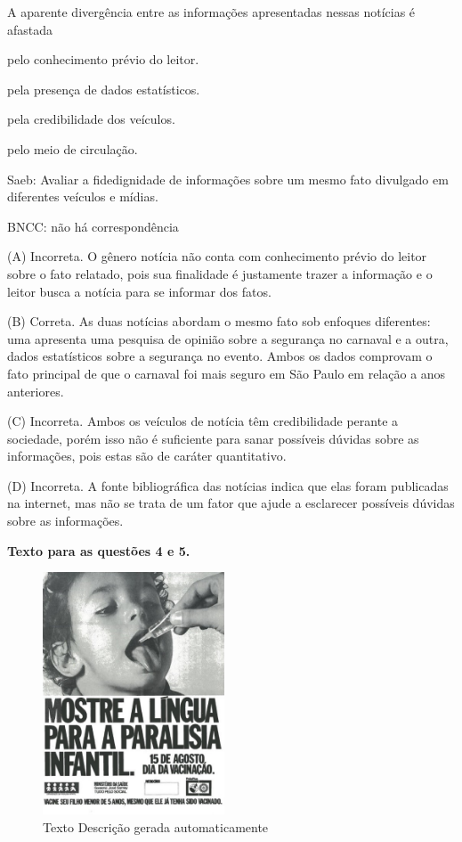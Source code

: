 
A aparente divergência entre as informações apresentadas nessas notícias
é afastada

\begin{escolha}
\item pelo conhecimento prévio do leitor.

\item pela presença de dados estatísticos.

\item pela credibilidade dos veículos.

\item pelo meio de circulação.
\end{escolha}

Saeb: Avaliar a fidedignidade de informações sobre um mesmo fato
divulgado em diferentes veículos e mídias.

BNCC: não há correspondência

(A) Incorreta. O gênero notícia não conta com conhecimento prévio do
leitor sobre o fato relatado, pois sua finalidade é justamente trazer a
informação e o leitor busca a notícia para se informar dos fatos.

(B) Correta. As duas notícias abordam o mesmo fato sob enfoques
diferentes: uma apresenta uma pesquisa de opinião sobre a segurança no
carnaval e a outra, dados estatísticos sobre a segurança no evento.
Ambos os dados comprovam o fato principal de que o carnaval foi mais
seguro em São Paulo em relação a anos anteriores.

(C) Incorreta. Ambos os veículos de notícia têm credibilidade perante a
sociedade, porém isso não é suficiente para sanar possíveis dúvidas
sobre as informações, pois estas são de caráter quantitativo.

(D) Incorreta. A fonte bibliográfica das notícias indica que elas foram
publicadas na internet, mas não se trata de um fator que ajude a
esclarecer possíveis dúvidas sobre as informações.

\textbf{Texto para as questões 4 e 5.}

\begin{figure}
\centering
\includegraphics[width=2.12879in,height=2.83333in]{./imgSAEB_8_POR/media/image39.jpeg}
\caption{Texto Descrição gerada automaticamente}
\end{figure}

